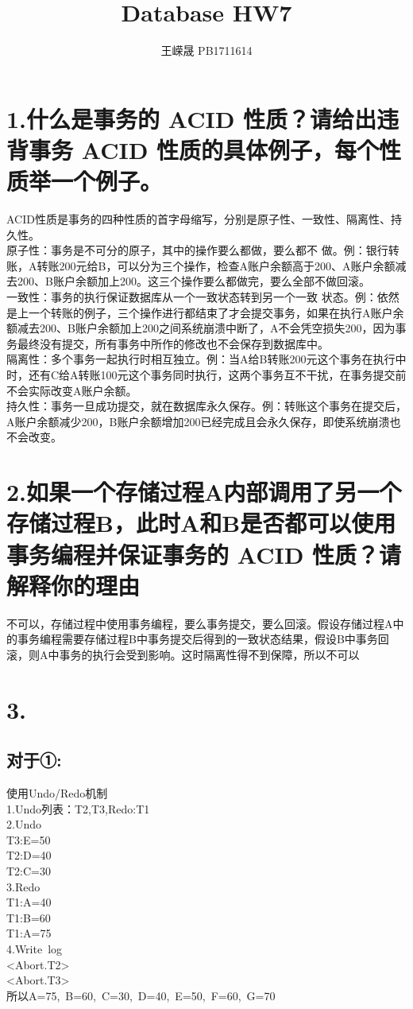 \documentclass{article}
\title{Database HW7}
\author{王嵘晟 \quad PB1711614}
\date{}
\begin{document}
	\maketitle
	\section*{1.什么是事务的 ACID 性质？请给出违背事务 ACID 性质的具体例子，每个性质举一个例子。}
	ACID性质是事务的四种性质的首字母缩写，分别是原子性、一致性、隔离性、持久性。\\
	原子性：事务是不可分的原子，其中的操作要么都做，要么都不
	做。例：银行转账，A转账200元给B，可以分为三个操作，检查A账户余额高于200、A账户余额减去200、B账户余额加上200。这三个操作要么都做完，要么全部不做回滚。\\
	一致性：事务的执行保证数据库从一个一致状态转到另一个一致
	状态。例：依然是上一个转账的例子，三个操作进行都结束了才会提交事务，如果在执行A账户余额减去200、B账户余额加上200之间系统崩溃中断了，A不会凭空损失200，因为事务最终没有提交，所有事务中所作的修改也不会保存到数据库中。\\
	隔离性：多个事务一起执行时相互独立。例：当A给B转账200元这个事务在执行中时，还有C给A转账100元这个事务同时执行，这两个事务互不干扰，在事务提交前不会实际改变A账户余额。\\
	持久性：事务一旦成功提交，就在数据库永久保存。例：转账这个事务在提交后，A账户余额减少200，B账户余额增加200已经完成且会永久保存，即使系统崩溃也不会改变。
	\section*{2.如果一个存储过程A内部调用了另一个存储过程B，此时A和B是否都可以使用事务编程并保证事务的 ACID 性质？请解释你的理由}
	不可以，存储过程中使用事务编程，要么事务提交，要么回滚。假设存储过程A中的事务编程需要存储过程B中事务提交后得到的一致状态结果，假设B中事务回滚，则A中事务的执行会受到影响。这时隔离性得不到保障，所以不可以
	\section*{3.}
	\subsection*{对于①:}
	使用Undo/Redo机制\\
	1.Undo列表：{T2,T3},Redo:{T1}\\
	2.Undo\\
	T3:E=50\\
	T2:D=40\\
	T2:C=30\\
	3.Redo\\
	T1:A=40\\
	T1:B=60\\
	T1:A=75\\
	4.Write\ log\\
	<Abort.T2>\\
	<Abort.T3>\\
	所以A=75,\ B=60,\ C=30,\ D=40,\ E=50,\ F=60,\ G=70
\end{document}
